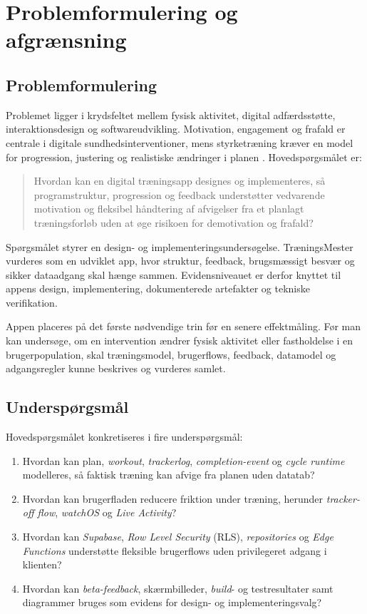 \section{Problemformulering og afgrænsning}

\subsection{Problemformulering}

Problemet ligger i krydsfeltet mellem fysisk aktivitet, digital adfærdsstøtte, interaktionsdesign og softwareudvikling. Motivation, engagement og frafald er centrale i digitale sundhedsinterventioner, mens styrketræning kræver en model for progression, justering og realistiske ændringer i planen \cite{teixeira2012_sdt_exercise,eysenbach2005_law_of_attrition,acsm2009_progression_models}. Hovedspørgsmålet er:

\begin{quote}
Hvordan kan en digital træningsapp designes og implementeres, så programstruktur, progression og feedback understøtter vedvarende motivation og fleksibel håndtering af afvigelser fra et planlagt træningsforløb uden at øge risikoen for demotivation og frafald?
\end{quote}

Spørgsmålet styrer en design- og implementeringsundersøgelse. TræningsMester vurderes som en udviklet app, hvor struktur, feedback, brugsmæssigt besvær og sikker dataadgang skal hænge sammen. Evidensniveauet er derfor knyttet til appens design, implementering, dokumenterede artefakter og tekniske verifikation.

Appen placeres på det første nødvendige trin før en senere effektmåling. Før man kan undersøge, om en intervention ændrer fysisk aktivitet eller fastholdelse i en brugerpopulation, skal træningsmodel, brugerflows, feedback, datamodel og adgangsregler kunne beskrives og vurderes samlet.

\subsection{Underspørgsmål}

Hovedspørgsmålet konkretiseres i fire underspørgsmål:

\begin{enumerate}
    \item Hvordan kan plan, \emph{workout}, \emph{trackerlog}, \emph{completion-event} og \emph{cycle runtime} modelleres, så faktisk træning kan afvige fra planen uden datatab?
    \item Hvordan kan brugerfladen reducere friktion under træning, herunder \emph{tracker-off flow}, \emph{watchOS} og \emph{Live Activity}?
    \item Hvordan kan \emph{Supabase}, \emph{Row Level Security} (RLS), \emph{repositories} og \emph{Edge Functions} understøtte fleksible brugerflows uden privilegeret adgang i klienten?
    \item Hvordan kan \emph{beta-feedback}, skærmbilleder, \emph{build}- og testresultater samt diagrammer bruges som evidens for design- og implementeringsvalg?
\end{enumerate}

